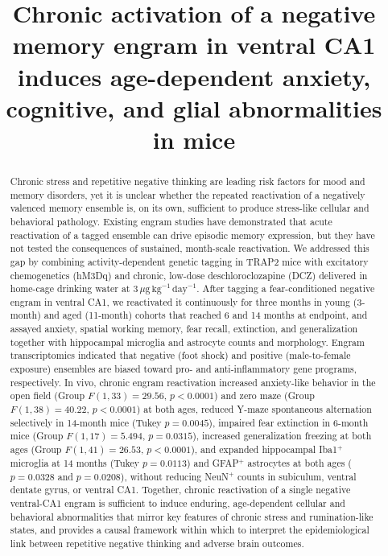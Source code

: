 \documentclass[11pt]{article}
\title{Chronic activation of a negative memory engram in ventral CA1 induces age-dependent anxiety, cognitive, and glial abnormalities in mice}
\author{}
\date{}
\begin{document}
\maketitle

\begin{abstract}
Chronic stress and repetitive negative thinking are leading risk factors for mood and memory disorders, yet it is unclear whether the repeated reactivation of a negatively valenced memory ensemble is, on its own, sufficient to produce stress-like cellular and behavioral pathology. Existing engram studies have demonstrated that acute reactivation of a tagged ensemble can drive episodic memory expression, but they have not tested the consequences of sustained, month-scale reactivation. We addressed this gap by combining activity-dependent genetic tagging in TRAP2 mice with excitatory chemogenetics (hM3Dq) and chronic, low-dose deschloroclozapine (DCZ) delivered in home-cage drinking water at $3\,\mu\mathrm{g}\,\mathrm{kg}^{-1}\,\mathrm{day}^{-1}$. After tagging a fear-conditioned negative engram in ventral CA1, we reactivated it continuously for three months in young (3-month) and aged (11-month) cohorts that reached 6 and 14 months at endpoint, and assayed anxiety, spatial working memory, fear recall, extinction, and generalization together with hippocampal microglia and astrocyte counts and morphology. Engram transcriptomics indicated that negative (foot shock) and positive (male-to-female exposure) ensembles are biased toward pro- and anti-inflammatory gene programs, respectively. In vivo, chronic engram reactivation increased anxiety-like behavior in the open field (Group $F(1,33)=29.56$, $p<0.0001$) and zero maze (Group $F(1,38)=40.22$, $p<0.0001$) at both ages, reduced Y-maze spontaneous alternation selectively in 14-month mice (Tukey $p=0.0045$), impaired fear extinction in 6-month mice (Group $F(1,17)=5.494$, $p=0.0315$), increased generalization freezing at both ages (Group $F(1,41)=26.53$, $p<0.0001$), and expanded hippocampal Iba1$^{+}$ microglia at 14 months (Tukey $p=0.0113$) and GFAP$^{+}$ astrocytes at both ages ($p=0.0328$ and $p=0.0208$), without reducing NeuN$^{+}$ counts in subiculum, ventral dentate gyrus, or ventral CA1. Together, chronic reactivation of a single negative ventral-CA1 engram is sufficient to induce enduring, age-dependent cellular and behavioral abnormalities that mirror key features of chronic stress and rumination-like states, and provides a causal framework within which to interpret the epidemiological link between repetitive negative thinking and adverse brain outcomes.
\end{abstract}
\end{document}
